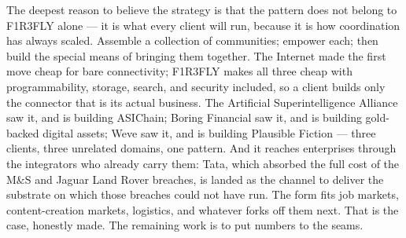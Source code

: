 \documentclass[11pt]{article}
\begin{document}
The deepest reason to believe the strategy is that the pattern does not belong to F1R3FLY alone --- it is what every client will run, because it is how coordination has always scaled. Assemble a collection of communities; empower each; then build the special means of bringing them together. The Internet made the first move cheap for bare connectivity; F1R3FLY makes all three cheap with programmability, storage, search, and security included, so a client builds only the connector that is its actual business. The Artificial Superintelligence Alliance saw it, and is building ASIChain; Boring Financial saw it, and is building gold-backed digital assets; Weve saw it, and is building Plausible Fiction --- three clients, three unrelated domains, one pattern. And it reaches enterprises through the integrators who already carry them: Tata, which absorbed the full cost of the M\&S and Jaguar Land Rover breaches, is landed as the channel to deliver the substrate on which those breaches could not have run. The form fits job markets, content-creation markets, logistics, and whatever forks off them next. That is the case, honestly made. The remaining work is to put numbers to the seams.
\end{document}
